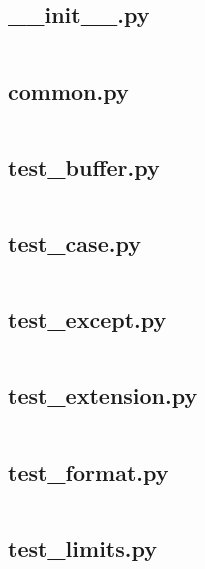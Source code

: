 \documentclass{article}
\begin{document}
\subsection{\_\_init\_\_.py}
\inputminted{python}{/home/dufferzafar/dev/@clones/pandas/pandas/tests/io/msgpack/__init__.py}
\newpage

\subsection{common.py}
\inputminted{python}{/home/dufferzafar/dev/@clones/pandas/pandas/tests/io/msgpack/common.py}
\newpage

\subsection{test\_buffer.py}
\inputminted{python}{/home/dufferzafar/dev/@clones/pandas/pandas/tests/io/msgpack/test_buffer.py}
\newpage

\subsection{test\_case.py}
\inputminted{python}{/home/dufferzafar/dev/@clones/pandas/pandas/tests/io/msgpack/test_case.py}
\newpage

\subsection{test\_except.py}
\inputminted{python}{/home/dufferzafar/dev/@clones/pandas/pandas/tests/io/msgpack/test_except.py}
\newpage

\subsection{test\_extension.py}
\inputminted{python}{/home/dufferzafar/dev/@clones/pandas/pandas/tests/io/msgpack/test_extension.py}
\newpage

\subsection{test\_format.py}
\inputminted{python}{/home/dufferzafar/dev/@clones/pandas/pandas/tests/io/msgpack/test_format.py}
\newpage

\subsection{test\_limits.py}
\inputminted{python}{/home/dufferzafar/dev/@clones/pandas/pandas/tests/io/msgpack/test_limits.py}
\newpage
\end{document}
